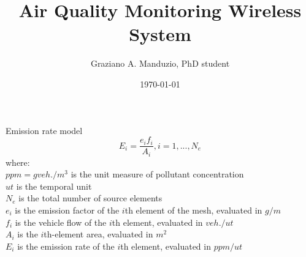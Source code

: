 \documentclass{beamer}
\title{Air Quality Monitoring Wireless System}
\author{Graziano A. Manduzio, PhD student}
\institute{University of Florence}
\date{\today}
\begin{document}
\begin{frame}
	\titlepage
\end{frame}

\begin{frame}
Emission rate model
\begin{equation}
	E_i=\dfrac{e_if_i}{A_i}, i=1,...,N_e
\end{equation}
	where:\\
	$ppm=gveh./m^3$ is the unit measure of pollutant concentration\\
	$ut$ is the temporal unit\\
	$N_e$ is the total number of source elements\\
	$e_i$ is the emission factor of the $i$th element of the mesh, evaluated in $g/m$\\
	$f_i$ is the vehicle flow of the $i$th element, evaluated in $veh./ut$\\
	$A_i$ is the $i$th-element area, evaluated in $m^2$\\
	$E_i$ is the emission rate of the $i$th element, evaluated in $ppm/ut$  
\end{frame}


\end{document}
